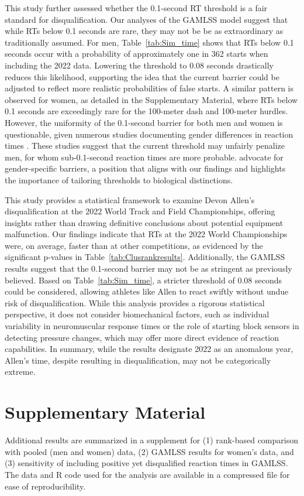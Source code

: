 \documentclass[12pt, letterpaper]{article}
\begin{document}
This study further assessed whether the 0.1-second RT threshold is a
fair standard for disqualification. Our analyses of the GAMLSS model
suggest that while RTs below 0.1 seconds are rare, they may not be
be as extraordinary as traditionally assumed. For men,
Table~\ref{tab:Sim_time} shows that RTs below 0.1 seconds
occur with a probability of approximately one in 362 starts when
including the 2022 data. Lowering the threshold to 0.08 seconds
drastically reduces this likelihood, supporting the idea that the
current barrier could be adjusted to reflect more realistic
probabilities of false starts. A similar pattern is observed for
women, as detailed in the Supplementary Material, where RTs
 below 0.1 seconds are exceedingly rare for the 100-meter dash
and 100-meter  hurdles. However, the uniformity of the 0.1-second
barrier for both men and women  is questionable, given numerous
studies documenting gender differences in reaction  times
\citep[e.g.,][]{lipps2011implications, babicc2009reaction,
  panoutsakopoulos2020gender}. These studies suggest that the current
threshold may  unfairly penalize men, for whom sub-0.1-second reaction
times are more probable. \citet{brosnan2017effects} advocate for
gender-specific barriers, a position that  aligns with our findings
and highlights the importance of tailoring thresholds to biological
distinctions.


This study provides a statistical framework to examine Devon Allen’s
disqualification at the 2022 World Track and Field Championships,
offering insights rather than drawing definitive conclusions about
potential equipment malfunction. Our findings indicate that RTs
 at the 2022 World Championships were, on average, faster than at other
competitions, as evidenced by the significant p-values in
Table~\ref{tab:Clusrankresults}. Additionally, the GAMLSS results
suggest that the 0.1-second barrier may not be as stringent as
previously believed. Based on Table~\ref{tab:Sim_time}, a stricter
threshold of 0.08 seconds could be considered, allowing athletes like
Allen to react swiftly without undue risk of disqualification. While
this analysis provides a rigorous statistical perspective, it does not
consider biomechanical factors, such as individual variability in
neuromuscular response times or the role of starting block sensors in
detecting pressure changes, which may offer more direct evidence of
reaction capabilities. In summary, while the results designate 2022 as
an anomalous year, Allen’s time, despite resulting in
disqualification, may not be categorically extreme.


\section*{Supplementary Material}
Additional results are summarized in a supplement for (1) rank-based
comparison with pooled (men and women) data, (2) GAMLSS results
for women's data, and (3) sensitivity of including positive yet disqualified
reaction times in GAMLSS.
The data and R code used for the analysis are available in a compressed file for
ease of reproducibility.



\end{document}
